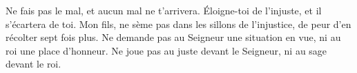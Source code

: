 Ne fais pas le mal, et aucun mal ne t’arrivera.
	Éloigne-toi de l’injuste, et il s’écartera de toi.
Mon fils, ne sème pas dans les sillons de l’injustice,
	de peur d’en récolter sept fois plus.
Ne demande pas au Seigneur une situation en vue, ni au roi une place d’honneur.
	Ne joue pas au juste devant le Seigneur, ni au sage devant le roi.
